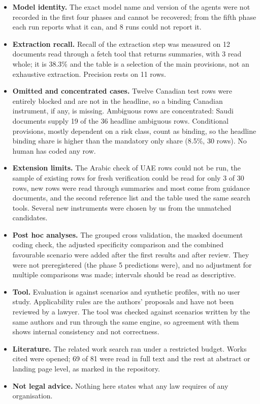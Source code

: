 \documentclass[conference]{IEEEtran}
\begin{document}
\begin{itemize}
\item \textbf{Model identity.} The exact model name and version of the agents were not recorded in the first four phases and cannot be recovered; from the fifth phase each run reports what it can, and 8 runs could not report it.
\item \textbf{Extraction recall.} Recall of the extraction step was measured on 12 documents read through a fetch tool that returns summaries, with 3 read whole; it is 38.3\% and the table is a selection of the main provisions, not an exhaustive extraction. Precision rests on 11 rows.
\item \textbf{Omitted and concentrated cases.} Twelve Canadian test rows were entirely blocked and are not in the headline, so a binding Canadian instrument, if any, is missing. Ambiguous rows are concentrated: Saudi documents supply 19 of the 36 headline ambiguous rows. Conditional provisions, mostly dependent on a risk class, count as binding, so the headline binding share is higher than the mandatory only share (8.5\%, 30 rows). No human has coded any row.
\item \textbf{Extension limits.} The Arabic check of UAE rows could not be run, the sample of existing rows for fresh verification could be read for only 3 of 30 rows, new rows were read through summaries and most come from guidance documents, and the second reference list and the table used the same search tools. Several new instruments were chosen by us from the unmatched candidates.
\item \textbf{Post hoc analyses.} The grouped cross validation, the masked document coding check, the adjusted specificity comparison and the combined favourable scenario were added after the first results and after review. They were not preregistered (the phase 5 predictions were), and no adjustment for multiple comparisons was made; intervals should be read as descriptive.
\item \textbf{Tool.} Evaluation is against scenarios and synthetic profiles, with no user study. Applicability rules are the authors' proposals and have not been reviewed by a lawyer. The tool was checked against scenarios written by the same authors and run through the same engine, so agreement with them shows internal consistency and not correctness.
\item \textbf{Literature.} The related work search ran under a restricted budget. Works cited were opened; 69 of 81 were read in full text and the rest at abstract or landing page level, as marked in the repository.
\item \textbf{Not legal advice.} Nothing here states what any law requires of any organisation.
\end{itemize}
\end{document}
